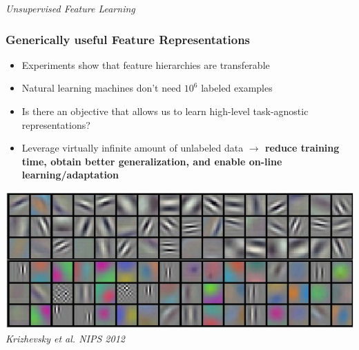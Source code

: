 \documentclass{beamer}
\begin{document}
\begin{frame}
\begin{center} 
\huge \color{blue} \emph{Unsupervised Feature Learning}
\end{center} 
\end{frame} 

\begin{frame}
\frametitle{Generically useful Feature Representations} 
\begin{itemize} 
\item{Experiments show that feature hierarchies are transferable}
\item{Natural learning machines don't need $10^6$ labeled examples}
\item{Is there an objective that allows us to learn high-level task-agnostic representations?}
\item{Leverage virtually infinite amount of unlabeled data \bf $\rightarrow$ reduce training time, obtain better generalization, and enable on-line learning/adaptation}
\end{itemize} 
\centering
\includegraphics[scale=0.25]{./Figures/weights.jpeg} \\
\emph{\tiny{Krizhevsky et al. NIPS 2012}} 
\end{frame} 
\end{document}

